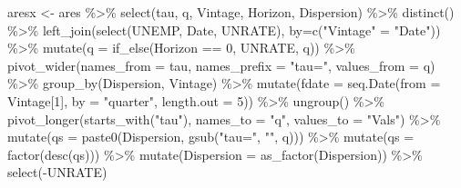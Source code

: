 \documentclass[
  letterpaper,
]{book}
\newenvironment{Shaded}{\begin{snugshade}}{\end{snugshade}}
\newcommand{\AttributeTok}[1]{\textcolor[rgb]{0.40,0.45,0.13}{#1}}
\newcommand{\DecValTok}[1]{\textcolor[rgb]{0.68,0.00,0.00}{#1}}
\newcommand{\FunctionTok}[1]{\textcolor[rgb]{0.28,0.35,0.67}{#1}}
\newcommand{\NormalTok}[1]{\textcolor[rgb]{0.00,0.23,0.31}{#1}}
\newcommand{\OtherTok}[1]{\textcolor[rgb]{0.00,0.23,0.31}{#1}}
\newcommand{\SpecialCharTok}[1]{\textcolor[rgb]{0.37,0.37,0.37}{#1}}
\newcommand{\StringTok}[1]{\textcolor[rgb]{0.13,0.47,0.30}{#1}}
\begin{document}
\begin{Shaded}
\begin{Highlighting}[]
\NormalTok{aresx }\OtherTok{\textless{}{-}}\NormalTok{ ares }\SpecialCharTok{\%\textgreater{}\%} 
  \FunctionTok{select}\NormalTok{(tau, q, Vintage, Horizon, Dispersion) }\SpecialCharTok{\%\textgreater{}\%} 
  \FunctionTok{distinct}\NormalTok{() }\SpecialCharTok{\%\textgreater{}\%}
  \FunctionTok{left\_join}\NormalTok{(}\FunctionTok{select}\NormalTok{(UNEMP, Date, UNRATE), }\AttributeTok{by=}\FunctionTok{c}\NormalTok{(}\StringTok{"Vintage"} \OtherTok{=} \StringTok{"Date"}\NormalTok{)) }\SpecialCharTok{\%\textgreater{}\%} 
  \FunctionTok{mutate}\NormalTok{(}\AttributeTok{q =} \FunctionTok{if\_else}\NormalTok{(Horizon }\SpecialCharTok{==} \DecValTok{0}\NormalTok{, UNRATE, q)) }\SpecialCharTok{\%\textgreater{}\%} 
  \FunctionTok{pivot\_wider}\NormalTok{(}\AttributeTok{names\_from =}\NormalTok{ tau, }\AttributeTok{names\_prefix =} \StringTok{"tau="}\NormalTok{, }\AttributeTok{values\_from =}\NormalTok{ q) }\SpecialCharTok{\%\textgreater{}\%} 
  \FunctionTok{group\_by}\NormalTok{(Dispersion, Vintage) }\SpecialCharTok{\%\textgreater{}\%} 
  \FunctionTok{mutate}\NormalTok{(}\AttributeTok{fdate =} \FunctionTok{seq.Date}\NormalTok{(}\AttributeTok{from =}\NormalTok{ Vintage[}\DecValTok{1}\NormalTok{], }\AttributeTok{by =} \StringTok{"quarter"}\NormalTok{, }\AttributeTok{length.out =} \DecValTok{5}\NormalTok{)) }\SpecialCharTok{\%\textgreater{}\%} 
  \FunctionTok{ungroup}\NormalTok{() }\SpecialCharTok{\%\textgreater{}\%} 
  \FunctionTok{pivot\_longer}\NormalTok{(}\FunctionTok{starts\_with}\NormalTok{(}\StringTok{"tau"}\NormalTok{), }\AttributeTok{names\_to =} \StringTok{"q"}\NormalTok{, }\AttributeTok{values\_to =} \StringTok{"Vals"}\NormalTok{) }\SpecialCharTok{\%\textgreater{}\%} 
  \FunctionTok{mutate}\NormalTok{(}\AttributeTok{qs =} \FunctionTok{paste0}\NormalTok{(Dispersion, }\FunctionTok{gsub}\NormalTok{(}\StringTok{"tau="}\NormalTok{, }\StringTok{""}\NormalTok{, q))) }\SpecialCharTok{\%\textgreater{}\%}
  \FunctionTok{mutate}\NormalTok{(}\AttributeTok{qs =} \FunctionTok{factor}\NormalTok{(}\FunctionTok{desc}\NormalTok{(qs))) }\SpecialCharTok{\%\textgreater{}\%} 
  \FunctionTok{mutate}\NormalTok{(}\AttributeTok{Dispersion =} \FunctionTok{as\_factor}\NormalTok{(Dispersion)) }\SpecialCharTok{\%\textgreater{}\%} 
  \FunctionTok{select}\NormalTok{(}\SpecialCharTok{{-}}\NormalTok{UNRATE)}


\end{Highlighting}
\end{Shaded}
\end{document}
